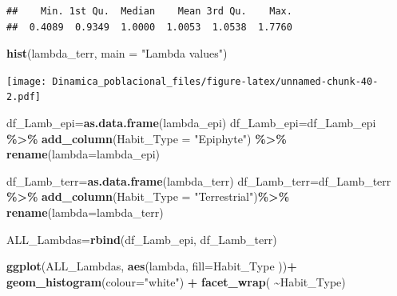\documentclass[
]{book}
\newenvironment{Shaded}{\begin{snugshade}}{\end{snugshade}}
\newcommand{\AttributeTok}[1]{\textcolor[rgb]{0.13,0.29,0.53}{#1}}
\newcommand{\FunctionTok}[1]{\textcolor[rgb]{0.13,0.29,0.53}{\textbf{#1}}}
\newcommand{\NormalTok}[1]{#1}
\newcommand{\OtherTok}[1]{\textcolor[rgb]{0.56,0.35,0.01}{#1}}
\newcommand{\SpecialCharTok}[1]{\textcolor[rgb]{0.81,0.36,0.00}{\textbf{#1}}}
\newcommand{\StringTok}[1]{\textcolor[rgb]{0.31,0.60,0.02}{#1}}
\theoremstyle{definition}
\theoremstyle{definition}
\theoremstyle{definition}
\theoremstyle{definition}
\theoremstyle{remark}
\begin{document}
\begin{verbatim}
##    Min. 1st Qu.  Median    Mean 3rd Qu.    Max. 
##  0.4089  0.9349  1.0000  1.0053  1.0538  1.7760
\end{verbatim}

\begin{Shaded}
\begin{Highlighting}[]
\FunctionTok{hist}\NormalTok{(lambda\_terr, }\AttributeTok{main =} \StringTok{"Lambda values"}\NormalTok{)}
\end{Highlighting}
\end{Shaded}

\texttt{[image: Dinamica\_poblacional\_files/figure-latex/unnamed-chunk-40-2.pdf]}

\begin{Shaded}
\begin{Highlighting}[]
\NormalTok{df\_Lamb\_epi}\OtherTok{=}\FunctionTok{as.data.frame}\NormalTok{(lambda\_epi)}
\NormalTok{df\_Lamb\_epi}\OtherTok{=}\NormalTok{df\_Lamb\_epi }\SpecialCharTok{\%\textgreater{}\%} 
  \FunctionTok{add\_column}\NormalTok{(}\AttributeTok{Habit\_Type =} \StringTok{"Epiphyte"}\NormalTok{) }\SpecialCharTok{\%\textgreater{}\%} 
  \FunctionTok{rename}\NormalTok{(}\AttributeTok{lambda=}\NormalTok{lambda\_epi)}


\NormalTok{df\_Lamb\_terr}\OtherTok{=}\FunctionTok{as.data.frame}\NormalTok{(lambda\_terr)}
\NormalTok{df\_Lamb\_terr}\OtherTok{=}\NormalTok{df\_Lamb\_terr }\SpecialCharTok{\%\textgreater{}\%} 
  \FunctionTok{add\_column}\NormalTok{(}\AttributeTok{Habit\_Type =} \StringTok{"Terrestrial"}\NormalTok{)}\SpecialCharTok{\%\textgreater{}\%} 
  \FunctionTok{rename}\NormalTok{(}\AttributeTok{lambda=}\NormalTok{lambda\_terr)}


\NormalTok{ALL\_Lambdas}\OtherTok{=}\FunctionTok{rbind}\NormalTok{(df\_Lamb\_epi, df\_Lamb\_terr)}
\end{Highlighting}
\end{Shaded}

\begin{Shaded}
\begin{Highlighting}[]
\FunctionTok{ggplot}\NormalTok{(ALL\_Lambdas, }\FunctionTok{aes}\NormalTok{(lambda, }\AttributeTok{fill=}\NormalTok{Habit\_Type ))}\SpecialCharTok{+}
  \FunctionTok{geom\_histogram}\NormalTok{(}\AttributeTok{colour=}\StringTok{"white"}\NormalTok{) }\SpecialCharTok{+} 
  \FunctionTok{facet\_wrap}\NormalTok{( }\SpecialCharTok{\textasciitilde{}}\NormalTok{Habit\_Type)}
\end{Highlighting}
\end{Shaded}
\end{document}
